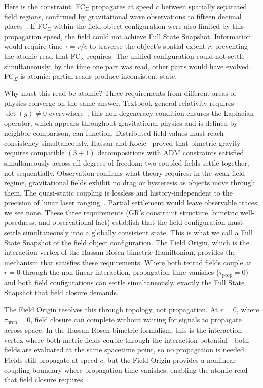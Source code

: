 \documentclass[aps,prd,preprint,superscriptaddress,showpacs,preprintnumbers,amsmath,amssymb,nofootinbib]{revtex4-2}
\begin{document}
Here is the constraint: FC$_{\Sigma}$ propagates at speed $c$ between spatially separated field regions, confirmed by gravitational wave observations to fifteen decimal places~\cite{gw170817}. If FC$_{\Sigma}$ within the field object configuration were also limited by this propagation speed, the field could not achieve Full State Snapshot. Information would require time $\tau = r/c$ to traverse the object's spatial extent $r$, preventing the atomic read that FC$_{\Sigma}$ requires. The unified configuration could not settle simultaneously; by the time one part was read, other parts would have evolved. FC$_{\Sigma}$ is atomic: partial reads produce inconsistent state.

Why must this read be atomic? Three requirements from different areas of physics converge on the same answer. Textbook general relativity requires $\det(g) \neq 0$ everywhere~\cite{mtw1973,wald1984}; this non-degeneracy condition ensures the Laplacian operator, which appears throughout gravitational physics and is defined by neighbor comparison, can function. Distributed field values must reach consistency simultaneously. Hassan and Kocic~\cite{hassankocic2018} proved that bimetric gravity requires compatible $(3{+}1)$ decompositions with ADM constraints satisfied simultaneously across all degrees of freedom: two coupled fields settle together, not sequentially. Observation confirms what theory requires: in the weak-field regime, gravitational fields exhibit no drag or hysteresis as objects move through them. The quasi-static coupling is lossless and history-independent to the precision of lunar laser ranging~\cite{williams2004}. Partial settlement would leave observable traces; we see none. These three requirements (GR's constraint structure, bimetric well-posedness, and observational fact) establish that the field configuration must settle simultaneously into a globally consistent state. This is what we call a Full State Snapshot of the field object configuration. The Field Origin, which is the interaction vertex of the Hassan-Rosen bimetric Hamiltonian, provides the mechanism that satisfies these requirements. Where both tetrad fields couple at $r = 0$ through the non-linear interaction, propagation time vanishes ($\tau_{\text{prop}} = 0$) and both field configurations can settle simultaneously, exactly the Full State Snapshot that field closure demands.

The Field Origin resolves this through topology, not propagation. At $r = 0$, where $\tau_{\text{prop}} = 0$, field closure can complete without waiting for signals to propagate across space. In the Hassan-Rosen bimetric formalism, this is the interaction vertex where both metric fields couple through the interaction potential---both fields are evaluated at the same spacetime point, so no propagation is needed. Fields still propagate at speed $c$, but the Field Origin provides a nonlinear coupling boundary where propagation time vanishes, enabling the atomic read that field closure requires.
\end{document}
